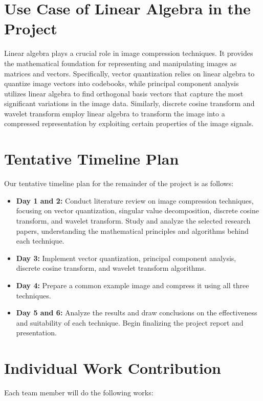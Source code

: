 \documentclass{article}
\begin{document}
\section{Use Case of Linear Algebra in the Project}
Linear algebra plays a crucial role in image compression techniques. It provides the mathematical foundation for representing and manipulating images as matrices and vectors. Specifically, vector quantization relies on linear algebra to quantize image vectors into codebooks, while principal component analysis utilizes linear algebra to find orthogonal basis vectors that capture the most significant variations in the image data. Similarly, discrete cosine transform and wavelet transform employ linear algebra to transform the image into a compressed representation by exploiting certain properties of the image signals.

\section{Tentative Timeline Plan}
Our tentative timeline plan for the remainder of the project is as follows:

\begin{itemize}
    \item \textbf{Day 1 and 2:} Conduct literature review on image compression techniques, focusing on vector quantization, singular value decomposition, discrete cosine transform, and wavelet transform. Study and analyze the selected research papers, understanding the mathematical principles and algorithms behind each technique.
    \item \textbf{Day 3:} Implement vector quantization, principal component analysis, discrete cosine transform, and wavelet transform algorithms.
    \item \textbf{Day 4:} Prepare a common example image and compress it using all three techniques.
    \item \textbf{Day 5 and 6:} Analyze the results and draw conclusions on the effectiveness and suitability of each technique. Begin finalizing the project report and presentation.
\end{itemize}

\section{Individual Work Contribution}
Each team member will do the following works:
\end{document}

